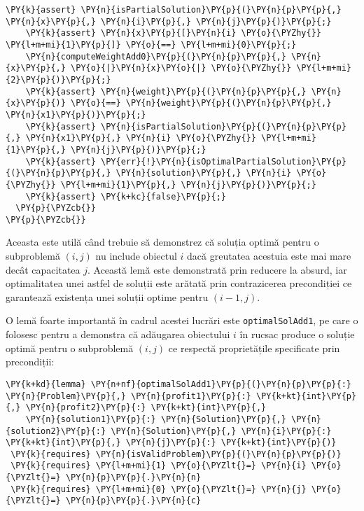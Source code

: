 \begin{sloppypar}
\begin{Verbatim}[commandchars=\\\{\}]
    \PY{k}{assert} \PY{n}{isPartialSolution}\PY{p}{(}\PY{n}{p}\PY{p}{,} \PY{n}{x}\PY{p}{,} \PY{n}{i}\PY{p}{,} \PY{n}{j}\PY{p}{)}\PY{p}{;}
    \PY{k}{assert} \PY{n}{x}\PY{p}{[}\PY{n}{i} \PY{o}{\PYZhy{}} \PY{l+m+mi}{1}\PY{p}{]} \PY{o}{==} \PY{l+m+mi}{0}\PY{p}{;}
    \PY{n}{computeWeightAdd0}\PY{p}{(}\PY{n}{p}\PY{p}{,} \PY{n}{x}\PY{p}{,} \PY{o}{|}\PY{n}{x}\PY{o}{|} \PY{o}{\PYZhy{}} \PY{l+m+mi}{2}\PY{p}{)}\PY{p}{;}
    \PY{k}{assert} \PY{n}{weight}\PY{p}{(}\PY{n}{p}\PY{p}{,} \PY{n}{x}\PY{p}{)} \PY{o}{==} \PY{n}{weight}\PY{p}{(}\PY{n}{p}\PY{p}{,} \PY{n}{x1}\PY{p}{)}\PY{p}{;}
    \PY{k}{assert} \PY{n}{isPartialSolution}\PY{p}{(}\PY{n}{p}\PY{p}{,} \PY{n}{x1}\PY{p}{,} \PY{n}{i} \PY{o}{\PYZhy{}} \PY{l+m+mi}{1}\PY{p}{,} \PY{n}{j}\PY{p}{)}\PY{p}{;}
    \PY{k}{assert} \PY{err}{!}\PY{n}{isOptimalPartialSolution}\PY{p}{(}\PY{n}{p}\PY{p}{,} \PY{n}{solution}\PY{p}{,} \PY{n}{i} \PY{o}{\PYZhy{}} \PY{l+m+mi}{1}\PY{p}{,} \PY{n}{j}\PY{p}{)}\PY{p}{;}
    \PY{k}{assert} \PY{k+kc}{false}\PY{p}{;}
  \PY{p}{\PYZcb{}}
\PY{p}{\PYZcb{}}
\end{Verbatim}
\hspace{4mm} Aceasta este utilă când trebuie să demonstrez că soluția optimă pentru o subproblemă $(i, j)$ nu include obiectul $i$ dacă greutatea acestuia este mai mare decât capacitatea $j$. Această lemă este demonstrată prin reducere la absurd, iar optimalitatea unei astfel de soluții este arătată prin contrazicerea precondiției ce garantează existența unei soluții optime pentru $(i - 1, j)$. \par
O lemă foarte importantă în cadrul acestei lucrări este \texttt{optimalSolAdd1}, pe care o folosesc pentru a demonstra că adăugarea obiectului $i$ în rucsac produce o soluție optimă pentru o subproblemă $(i, j)$ ce respectă proprietățile specificate prin precondiții:
\begin{Verbatim}[commandchars=\\\{\}]
\PY{k+kd}{lemma} \PY{n+nf}{optimalSolAdd1}\PY{p}{(}\PY{n}{p}\PY{p}{:} \PY{n}{Problem}\PY{p}{,} \PY{n}{profit1}\PY{p}{:} \PY{k+kt}{int}\PY{p}{,} \PY{n}{profit2}\PY{p}{:} \PY{k+kt}{int}\PY{p}{,} 
    \PY{n}{solution1}\PY{p}{:} \PY{n}{Solution}\PY{p}{,} \PY{n}{solution2}\PY{p}{:} \PY{n}{Solution}\PY{p}{,} \PY{n}{i}\PY{p}{:} \PY{k+kt}{int}\PY{p}{,} \PY{n}{j}\PY{p}{:} \PY{k+kt}{int}\PY{p}{)}
 \PY{k}{requires} \PY{n}{isValidProblem}\PY{p}{(}\PY{n}{p}\PY{p}{)}
 \PY{k}{requires} \PY{l+m+mi}{1} \PY{o}{\PYZlt{}=} \PY{n}{i} \PY{o}{\PYZlt{}=} \PY{n}{p}\PY{p}{.}\PY{n}{n}
 \PY{k}{requires} \PY{l+m+mi}{0} \PY{o}{\PYZlt{}=} \PY{n}{j} \PY{o}{\PYZlt{}=} \PY{n}{p}\PY{p}{.}\PY{n}{c}

\end{Verbatim}
\end{sloppypar}
